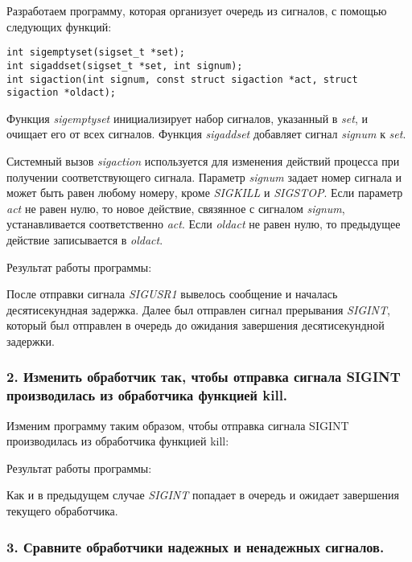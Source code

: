 \documentclass[14pt,a4paper,report]{report}
\begin{document}
Разработаем программу, которая организует очередь из сигналов, с помощью следующих функций:

\begin{verbatim}
int sigemptyset(sigset_t *set);
int sigaddset(sigset_t *set, int signum);
int sigaction(int signum, const struct sigaction *act, struct sigaction *oldact);
\end{verbatim}

Функция \emph{sigemptyset} инициализирует набор сигналов, указанный в \emph{set}, и очищает его от всех сигналов. Функция \emph{sigaddset} добавляет сигнал \emph{signum} к \emph{set}.

Системный вызов \emph{sigaction} используется для изменения действий процесса при получении соответствующего сигнала. Параметр \emph{signum} задает номер сигнала и может быть равен любому номеру, кроме \emph{SIGKILL} и \emph{SIGSTOP}. Если параметр \emph{act} не равен нулю, то новое действие, связянное с сигналом \emph{signum}, устанавливается соответственно \emph{act}. Если \emph{oldact} не равен нулю, то предыдущее действие записывается в \emph{oldact}.



Результат работы программы:



После отправки сигнала \emph{SIGUSR1} вывелось сообщение и началась десятисекундная задержка. Далее был отправлен сигнал прерывания \emph{SIGINT}, который был отправлен в очередь до ожидания завершения десятисекундной задержки.

\subsubsection{2.  Изменить обработчик так, чтобы отправка сигнала SIGINT производилась из обработчика функцией kill.}

Изменим программу таким образом, чтобы отправка сигнала SIGINT производилась из обработчика функцией kill:



Результат работы программы:



Как и в предыдущем случае \emph{SIGINT} попадает в очередь и ожидает завершения текущего обработчика.

\subsubsection{3.  Сравните обработчики надежных и ненадежных сигналов.}
\end{document}
